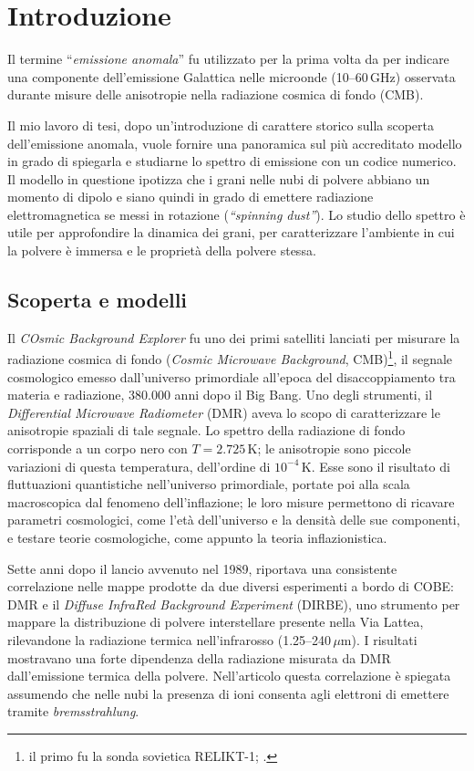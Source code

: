 \chapter{Introduzione}

Il termine ``\textit{emissione anomala}'' fu utilizzato per la prima volta da \textcite{L97} per indicare una componente dell'emissione Galattica nelle microonde (10--60\,GHz) osservata durante misure delle anisotropie nella radiazione cosmica di fondo (CMB).

Il mio lavoro di tesi, dopo un'introduzione di carattere storico sulla scoperta dell'emissione anomala, vuole fornire una panoramica sul più accreditato modello in grado di spiegarla e studiarne lo spettro di emissione con un codice numerico. Il modello in questione ipotizza che i grani nelle nubi di polvere abbiano un momento di dipolo e siano quindi in grado di emettere radiazione elettromagnetica se messi in rotazione (\textit{``spinning dust''}). Lo studio dello spettro è utile per approfondire la dinamica dei grani, per caratterizzare l'ambiente in cui la polvere è immersa e le proprietà della polvere stessa.

\section{Scoperta e modelli}

Il \textit{COsmic Background Explorer} \parencite[COBE,][]{Mather} fu uno dei primi satelliti lanciati per misurare la radiazione cosmica di fondo (\textit{Cosmic Microwave Background}, CMB)\footnote{il primo fu la sonda sovietica RELIKT-1; \cite{Relikt}.}, il segnale cosmologico emesso dall'universo primordiale all'epoca del disaccoppiamento tra materia e radiazione, 380.000 anni dopo il Big Bang. Uno degli strumenti, il \textit{Differential Microwave Radiometer} (DMR) aveva lo scopo di caratterizzare le anisotropie spaziali di tale segnale. Lo spettro della radiazione di fondo corrisponde a un corpo nero con $T = 2.725$\,K; le anisotropie sono piccole variazioni di questa temperatura, dell'ordine di $10^{-4}$\,K. Esse sono il risultato di fluttuazioni quantistiche nell'universo primordiale, portate poi alla scala macroscopica dal fenomeno dell'inflazione; le loro misure permettono di ricavare parametri cosmologici, come l'età dell'universo e la densità delle sue componenti, e testare teorie cosmologiche, come appunto la teoria inflazionistica.

Sette anni dopo il lancio avvenuto nel 1989, \textcite{K96} riportava una consistente correlazione nelle mappe prodotte da due diversi esperimenti a bordo di COBE: DMR e il \textit{Diffuse InfraRed Background Experiment} (DIRBE), uno strumento per mappare la distribuzione di polvere interstellare presente nella Via Lattea, rilevandone la radiazione termica nell'infrarosso (1.25--240\,$\mu$m). I risultati mostravano una forte dipendenza della radiazione misurata da DMR dall'emissione termica della polvere. Nell'articolo questa correlazione è spiegata assumendo che nelle nubi la presenza di ioni consenta agli elettroni di emettere tramite \textit{bremsstrahlung}.

